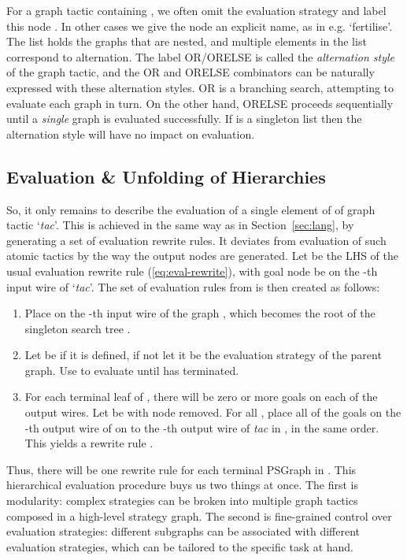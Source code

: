 \documentclass{llncs}
\begin{document}
For a graph tactic containing , we often omit the evaluation strategy and label this node . In other cases we give the node an explicit name, as in e.g. `fertilise'.
The list  holds the graphs that are nested, and multiple elements in the list correspond to alternation.
The label OR/ORELSE is called the \textit{alternation style} of the graph tactic, and the OR and ORELSE combinators
can be naturally expressed with these alternation styles. OR is a branching search, attempting to evaluate each graph  in turn. On the other hand, ORELSE proceeds sequentially until a \textit{single} graph is evaluated successfully. If
  is a singleton list then the alternation style will have no impact on evaluation.
 
 \beforesection
\subsection{Evaluation \& Unfolding of Hierarchies}
\aftersection


So, it only remains to describe the evaluation of a single element  of  of graph tactic `\textit{tac}'. 
This is achieved in the same
way as in Section~\ref{sec:lang}, by generating a set of evaluation rewrite rules. It deviates from evaluation
of such atomic tactics by the way the output nodes are generated. Let  be the LHS of the usual evaluation rewrite rule (\ref{eq:eval-rewrite}), with goal node  be on the -th input wire of `\textit{tac}'. The set of evaluation rules from  is then created as follows:
\begin{enumerate}
  \item Place  on the -th input wire of the graph , which becomes the root of the singleton search tree .
  \item Let  be  if it is defined, if not let it be the evaluation strategy of the parent graph. Use  to 
  evaluate  until  has terminated. 
\item For each terminal leaf  of , there will be zero or more goals on each of the output wires. Let  be
   with node  removed.  For all , place all of the goals on the -th output wire of  on to the -th output wire of \textit{tac} in , in the same order. This yields a rewrite rule .
\end{enumerate}
Thus, there will be one rewrite rule for each terminal PSGraph in . 
This hierarchical evaluation procedure buys us two things at once. The first is modularity: complex strategies can be broken into multiple graph tactics composed in a high-level strategy graph. The second is fine-grained control over evaluation strategies: different subgraphs can be associated with different evaluation strategies, which can be tailored to the specific task at hand.
\end{document}
